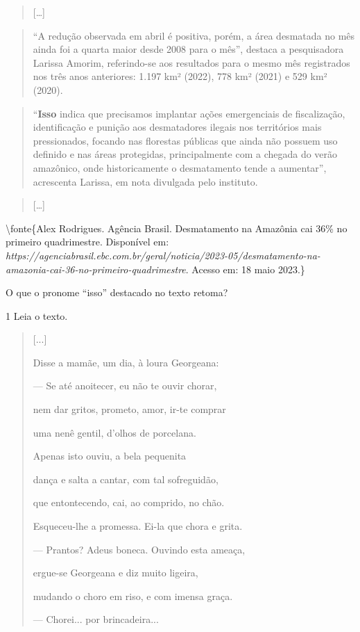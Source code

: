 \begin{quote}
{[}\ldots{]}
\end{quote}

\begin{quote}
``A redução observada em abril é positiva, porém, a área desmatada no
mês ainda foi a quarta maior desde 2008 para o mês'', destaca a
pesquisadora Larissa Amorim, referindo-se aos resultados para o mesmo
mês registrados nos três anos anteriores: 1.197 km² (2022), 778 km²
(2021) e 529 km² (2020).
\end{quote}

\begin{quote}
``\textbf{Isso} indica que precisamos implantar ações emergenciais de
fiscalização, identificação e punição aos desmatadores ilegais nos
territórios mais pressionados, focando nas florestas públicas que ainda
não possuem uso definido e nas áreas protegidas, principalmente com a
chegada do verão amazônico, onde historicamente o desmatamento tende a
aumentar'', acrescenta Larissa, em nota divulgada pelo instituto.
\end{quote}

\begin{quote}
{[}\ldots{]}
\end{quote}

\textbackslash fonte\{Alex Rodrigues. Agência Brasil. Desmatamento na
Amazônia cai 36\% no primeiro quadrimestre. Disponível em:
\emph{https://agenciabrasil.ebc.com.br/geral/noticia/2023-05/desmatamento-na-amazonia-cai-36-no-primeiro-quadrimestre}.
Acesso em: 18 maio 2023.\}

O que o pronome ``isso'' destacado no texto retoma?



\num{1} Leia o texto.

\begin{quote}
{[}...{]}

Disse a mamãe, um dia, à loura Georgeana:

--- Se até anoitecer, eu não te ouvir chorar,

nem dar gritos, prometo, amor, ir-te comprar

uma nenê gentil, d'olhos de porcelana.

Apenas isto ouviu, a bela pequenita

dança e salta a cantar, com tal sofreguidão,

que entontecendo, cai, ao comprido, no chão.

Esqueceu-lhe a promessa. Ei-la que chora e grita.

--- Prantos? Adeus boneca. Ouvindo esta ameaça,

ergue-se Georgeana e diz muito ligeira,

mudando o choro em riso, e com imensa graça.

--- Chorei... por brincadeira...
\end{quote}

